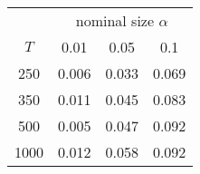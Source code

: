 % 
\begin{tabular}{cccc}
  \hline
  & \multicolumn{3}{c}{nominal size $\alpha$} \\
 $T$ & 0.01 & 0.05 & 0.1 \\
 \hline
250 & 0.006 & 0.033 & 0.069 \\ 
  350 & 0.011 & 0.045 & 0.083 \\ 
  500 & 0.005 & 0.047 & 0.092 \\ 
  1000 & 0.012 & 0.058 & 0.092 \\ 
   \hline
\end{tabular}
